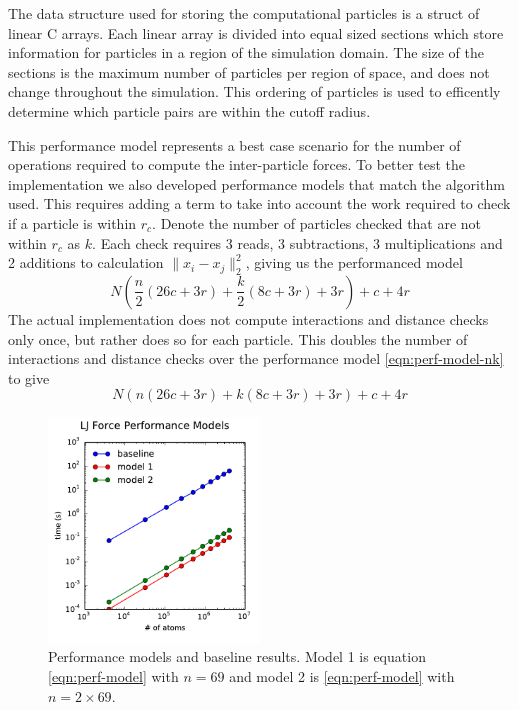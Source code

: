 \documentclass[12pt]{article}
\begin{document}
The data structure used for storing the computational particles is a
struct of linear C arrays. Each linear array is divided into equal
sized sections which store information for particles in a region of
the simulation domain. The size of the sections is the maximum number
of particles per region of space, and does not change throughout the
simulation. This ordering of particles is used to efficently determine
which particle pairs are within the cutoff radius.

This performance model represents a best case scenario for the number
of operations required to compute the inter-particle forces. To better
test the implementation we also developed performance models that
match the algorithm used. This requires adding a term to take into
account the work required to check if a particle is within
$r_c$. Denote the number of particles checked that are not within
$r_c$ as $k$. Each check requires 3 reads, 3 subtractions, 3
multiplications and 2 additions to calculation $\| x_i-x_j\|_2^2$,
giving us the performanced model
\begin{equation}
  N \left(\frac{n}{2} \left(26 c + 3 r\right)+\frac{k}{2} \left(8 c + 3 r\right) + 3 r\right) + c + 4 r
  \label{eqn:perf-model-nk}
\end{equation}
The actual implementation does not compute interactions and distance
checks only once, but rather does so for each particle. This doubles
the number of interactions and distance checks over the performance
model \ref{eqn:perf-model-nk} to give
\begin{equation}
  N \left(n \left(26 c + 3 r\right)+k \left(8 c + 3 r\right) + 3 r\right) + c + 4 r
  \label{eqn:perf-model-2n2k}
\end{equation}



\begin{figure}[h!]
  \centering
  \includegraphics[width=0.5\textwidth]{../figs/perfmodel_forceLJ}
  \caption{Performance models and baseline results. Model 1 is
    equation \ref{eqn:perf-model} with $n=69$ and model 2 is
    \ref{eqn:perf-model} with $n=2\times69$.}
  \label{fig:perf-models}
\end{figure}
\end{document}
